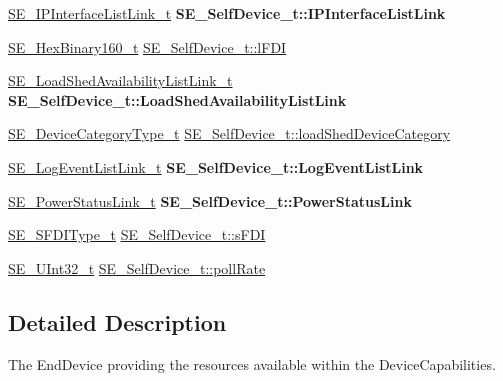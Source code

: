 \begin{DoxyCompactItemize}
\hyperlink{structSE__IPInterfaceListLink__t}{S\+E\+\_\+\+I\+P\+Interface\+List\+Link\+\_\+t} {\bfseries S\+E\+\_\+\+Self\+Device\+\_\+t\+::\+I\+P\+Interface\+List\+Link}
\item 
\hyperlink{group__HexBinary160_ga92b92aa55555bdb75f3a59060f2c1632}{S\+E\+\_\+\+Hex\+Binary160\+\_\+t} \hyperlink{group__SelfDevice_gadbf029568d8491054c76882da4576499}{S\+E\+\_\+\+Self\+Device\+\_\+t\+::l\+F\+DI}
\item 
\mbox{\label{group__SelfDevice_ga7526d05fd1fb07275952898b6279fbda}} 
\hyperlink{structSE__LoadShedAvailabilityListLink__t}{S\+E\+\_\+\+Load\+Shed\+Availability\+List\+Link\+\_\+t} {\bfseries S\+E\+\_\+\+Self\+Device\+\_\+t\+::\+Load\+Shed\+Availability\+List\+Link}
\item 
\hyperlink{group__DeviceCategoryType_gafc136ae19a3dd5b2fd2265d848ddeb2f}{S\+E\+\_\+\+Device\+Category\+Type\+\_\+t} \hyperlink{group__SelfDevice_ga8c97bdb8ed0564bd06baf603e87f586c}{S\+E\+\_\+\+Self\+Device\+\_\+t\+::load\+Shed\+Device\+Category}
\item 
\mbox{\label{group__SelfDevice_gae54c81cfc77a45dc95ed058d38ecf86d}} 
\hyperlink{structSE__LogEventListLink__t}{S\+E\+\_\+\+Log\+Event\+List\+Link\+\_\+t} {\bfseries S\+E\+\_\+\+Self\+Device\+\_\+t\+::\+Log\+Event\+List\+Link}
\item 
\mbox{\label{group__SelfDevice_ga68c61b4ba1cad9d743a4ae97065bb401}} 
\hyperlink{structSE__PowerStatusLink__t}{S\+E\+\_\+\+Power\+Status\+Link\+\_\+t} {\bfseries S\+E\+\_\+\+Self\+Device\+\_\+t\+::\+Power\+Status\+Link}
\item 
\hyperlink{group__SFDIType_ga08ad209b3cfce51cbdc450d1d35a1045}{S\+E\+\_\+\+S\+F\+D\+I\+Type\+\_\+t} \hyperlink{group__SelfDevice_ga751d47704f76026ac661f82420bb9248}{S\+E\+\_\+\+Self\+Device\+\_\+t\+::s\+F\+DI}
\item 
\hyperlink{group__UInt32_ga70bd4ecda3c0c85d20779d685a270cdb}{S\+E\+\_\+\+U\+Int32\+\_\+t} \hyperlink{group__SelfDevice_ga3a1b571c04f84d22a2fd7b3bfe32e487}{S\+E\+\_\+\+Self\+Device\+\_\+t\+::poll\+Rate}
\end{DoxyCompactItemize}


\subsection{Detailed Description}
The End\+Device providing the resources available within the Device\+Capabilities. 

